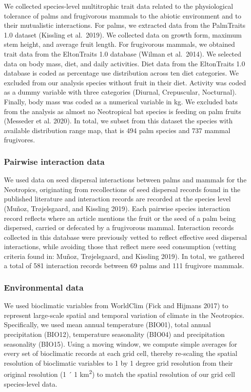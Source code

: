 \documentclass[
]{agujournal2019}
\begin{document}
We collected species-level multitrophic trait data related to the
physiological tolerance of palms and frugivorous mammals to the abiotic
environment and to their mutualistic interactions. For palms, we
extracted data from the PalmTraits 1.0 dataset (Kissling et al.~2019).
We collected data on growth form, maximum stem height, and average fruit
length. For frugivorous mammals, we obtained trait data from the
EltonTraits 1.0 database (Wilman et al.~2014). We selected data on body
mass, diet, and daily activities. Diet data from the EltonTraits 1.0
database is coded as percentage use distribution across ten diet
categories. We excluded from our analysis species without fruit in their
diet. Activity was coded as a dummy variable with three categories
(Diurnal, Crepuscular, Nocturnal). Finally, body mass was coded as a
numerical variable in kg. We excluded bats from the analysis as almost
no Neotropical bat species is feeding on palm fruits (Messeder et al.
2020). In total, we subset from this dataset the species with available
distribution range map, that is 494 palm species and 737 mammal
frugivores.

\subsubsection{Pairwise interaction
data}\label{pairwise-interaction-data}

We used data on seed dispersal interactions between palms and mammals
for the Neotropics, originating from recollections of seed dispersal
records found in the published literature and interaction records are
recorded at the species level (Muñoz, Trøjelsgaard, and Kissling 2019).
Each pairwise species interaction record reflects where an article
mentions the fruit or the seed of a palm being dispersed, carried or
defecated by a frugivorous mammal. Interaction records collected in this
database were previously vetted to reflect effective seed dispersal
interactions, while avoiding those that reflect mere seed consumption
(vetting criteria found in: Muñoz, Trøjelsgaard, and Kissling 2019). In
total, we gathered a total of 581 interaction records between 69 palms
and 111 frugivore mammals.

\subsubsection{Environmental data}\label{environmental-data}

We used bioclimatic variables from WorldClim (Fick and Hijmans 2017) to
represent large-scale spatial and temporal variation of climate in the
Neotropics. Specifically, we used mean annual temperature (BIO01), total
annual precipitation (BIO12), temperature seasonality (BIO04) and
precipitation seasonality (BIO15). Using a moving window, we compute
simple averages for every set of bioclimatic records at each grid cell,
thereby re-scaling the spatial resolution of bioclimatic variables to 1
by 1 degree grid resolution from their original resolution (1 ´ 1
km\textsuperscript{2}) to match the spatial resolution of our grid cell
species-level data.
\end{document}
